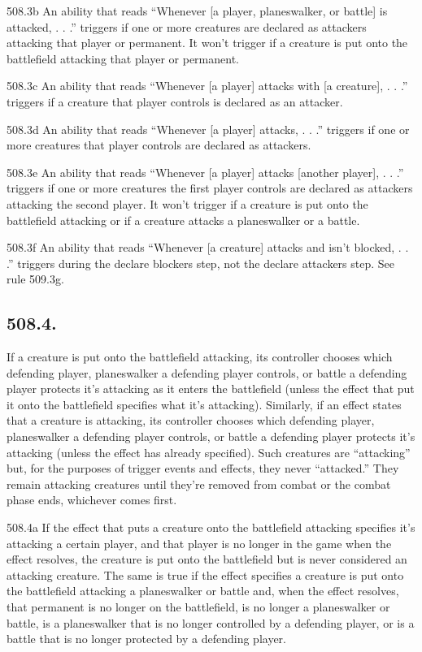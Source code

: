 508.3b An ability that reads “Whenever [a player, planeswalker, or battle] is attacked, . . .” triggers if one or more creatures are declared as attackers attacking that player or permanent. It won’t trigger if a creature is put onto the battlefield attacking that player or permanent.

508.3c An ability that reads “Whenever [a player] attacks with [a creature], . . .” triggers if a creature that player controls is declared as an attacker.

508.3d An ability that reads “Whenever [a player] attacks, . . .” triggers if one or more creatures that player controls are declared as attackers.

508.3e An ability that reads “Whenever [a player] attacks [another player], . . .” triggers if one or more creatures the first player controls are declared as attackers attacking the second player. It won’t trigger if a creature is put onto the battlefield attacking or if a creature attacks a planeswalker or a battle.

508.3f An ability that reads “Whenever [a creature] attacks and isn’t blocked, . . .” triggers during the declare blockers step, not the declare attackers step. See rule 509.3g.

\subsection*{508.4.}
If a creature is put onto the battlefield attacking, its controller chooses which defending player, planeswalker a defending player controls, or battle a defending player protects it’s attacking as it enters the battlefield (unless the effect that put it onto the battlefield specifies what it’s attacking). Similarly, if an effect states that a creature is attacking, its controller chooses which defending player, planeswalker a defending player controls, or battle a defending player protects it’s attacking (unless the effect has already specified). Such creatures are “attacking” but, for the purposes of trigger events and effects, they never “attacked.” They remain attacking creatures until they’re removed from combat or the combat phase ends, whichever comes first.

508.4a If the effect that puts a creature onto the battlefield attacking specifies it’s attacking a certain player, and that player is no longer in the game when the effect resolves, the creature is put onto the battlefield but is never considered an attacking creature. The same is true if the effect specifies a creature is put onto the battlefield attacking a planeswalker or battle and, when the effect resolves, that permanent is no longer on the battlefield, is no longer a planeswalker or battle, is a planeswalker that is no longer controlled by a defending player, or is a battle that is no longer protected by a defending player.

